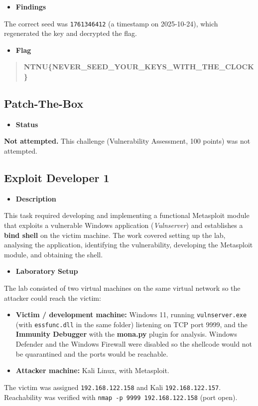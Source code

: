 \documentclass[11pt]{article}
\begin{document}
\begin{itemize}[leftmargin=1.5em]
    \item \textbf{Findings}
\end{itemize}
\noindent The correct seed was \texttt{1761346412} (a timestamp on 2025-10-24), which regenerated the key and decrypted the flag.

\begin{itemize}[leftmargin=1.5em]
    \item \textbf{Flag}
\end{itemize}
\begin{quote}
\textbf{NTNU\{NEVER\_SEED\_YOUR\_KEYS\_WITH\_THE\_CLOCK\}}
\end{quote}

\subsection{Patch-The-Box}

\begin{itemize}[leftmargin=1.5em]
    \item \textbf{Status}
\end{itemize}
\noindent \textbf{Not attempted.} This challenge (Vulnerability Assessment, 100 points) was not attempted.

\subsection{Exploit Developer 1}

\begin{itemize}[leftmargin=1.5em]
    \item \textbf{Description}
\end{itemize}
\noindent This task required developing and implementing a functional Metasploit module that exploits a vulnerable Windows application (\emph{Vulnserver}) and establishes a \textbf{bind shell} on the victim machine. The work covered setting up the lab, analysing the application, identifying the vulnerability, developing the Metasploit module, and obtaining the shell.

\begin{itemize}[leftmargin=1.5em]
    \item \textbf{Laboratory Setup}
\end{itemize}
\noindent The lab consisted of two virtual machines on the same virtual network so the attacker could reach the victim:
\begin{itemize}[leftmargin=2.2em]
    \item \textbf{Victim / development machine:} Windows 11, running \texttt{vulnserver.exe} (with \texttt{essfunc.dll} in the same folder) listening on TCP port 9999, and the \textbf{Immunity Debugger} with the \textbf{mona.py} plugin for analysis. Windows Defender and the Windows Firewall were disabled so the shellcode would not be quarantined and the ports would be reachable.
    \item \textbf{Attacker machine:} Kali Linux, with Metasploit.
\end{itemize}
\noindent The victim was assigned \texttt{192.168.122.158} and Kali \texttt{192.168.122.157}. Reachability was verified with \texttt{nmap -p 9999 192.168.122.158} (port open).
\end{document}
